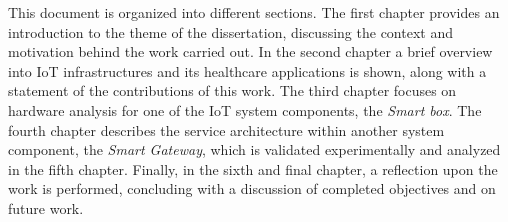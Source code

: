 This document is organized into different sections. The first chapter provides an introduction to the theme of the dissertation, discussing the context and motivation behind the work carried out. In the second chapter a brief overview into \acs{IoT} infrastructures and its healthcare applications is shown, along with a statement of the contributions of this work. The third chapter focuses on hardware analysis for one of the \acs{IoT} system components, the \textit{Smart box}. The fourth chapter describes the service architecture within another system component, the \textit{Smart Gateway}, which is validated experimentally and analyzed in the fifth chapter.
Finally, in the sixth and final chapter, a reflection upon the work is performed, concluding with a discussion of completed objectives and on future work.